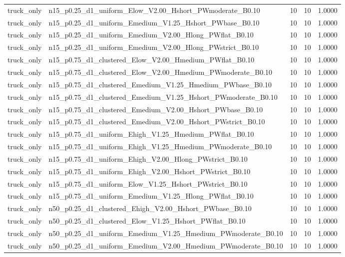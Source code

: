 \begin{tabular}{llrrr}
truck_only & n15_p0.25_d1_uniform_Elow_V2.00_Hshort_PWmoderate_B0.10 & 10 & 10 & 1.0000 \\
truck_only & n15_p0.25_d1_uniform_Emedium_V1.25_Hshort_PWbase_B0.10 & 10 & 10 & 1.0000 \\
truck_only & n15_p0.25_d1_uniform_Emedium_V2.00_Hlong_PWflat_B0.10 & 10 & 10 & 1.0000 \\
truck_only & n15_p0.25_d1_uniform_Emedium_V2.00_Hlong_PWstrict_B0.10 & 10 & 10 & 1.0000 \\
truck_only & n15_p0.75_d1_clustered_Elow_V2.00_Hmedium_PWflat_B0.10 & 10 & 10 & 1.0000 \\
truck_only & n15_p0.75_d1_clustered_Elow_V2.00_Hmedium_PWmoderate_B0.10 & 10 & 10 & 1.0000 \\
truck_only & n15_p0.75_d1_clustered_Emedium_V1.25_Hmedium_PWbase_B0.10 & 10 & 10 & 1.0000 \\
truck_only & n15_p0.75_d1_clustered_Emedium_V1.25_Hshort_PWmoderate_B0.10 & 10 & 10 & 1.0000 \\
truck_only & n15_p0.75_d1_clustered_Emedium_V2.00_Hshort_PWbase_B0.10 & 10 & 10 & 1.0000 \\
truck_only & n15_p0.75_d1_clustered_Emedium_V2.00_Hshort_PWstrict_B0.10 & 10 & 10 & 1.0000 \\
truck_only & n15_p0.75_d1_uniform_Ehigh_V1.25_Hmedium_PWflat_B0.10 & 10 & 10 & 1.0000 \\
truck_only & n15_p0.75_d1_uniform_Ehigh_V1.25_Hmedium_PWmoderate_B0.10 & 10 & 10 & 1.0000 \\
truck_only & n15_p0.75_d1_uniform_Ehigh_V2.00_Hlong_PWstrict_B0.10 & 10 & 10 & 1.0000 \\
truck_only & n15_p0.75_d1_uniform_Ehigh_V2.00_Hshort_PWstrict_B0.10 & 10 & 10 & 1.0000 \\
truck_only & n15_p0.75_d1_uniform_Elow_V1.25_Hshort_PWstrict_B0.10 & 10 & 10 & 1.0000 \\
truck_only & n15_p0.75_d1_uniform_Emedium_V1.25_Hlong_PWflat_B0.10 & 10 & 10 & 1.0000 \\
truck_only & n50_p0.25_d1_clustered_Ehigh_V2.00_Hshort_PWbase_B0.10 & 10 & 10 & 1.0000 \\
truck_only & n50_p0.25_d1_clustered_Elow_V1.25_Hshort_PWflat_B0.10 & 10 & 10 & 1.0000 \\
truck_only & n50_p0.25_d1_uniform_Emedium_V1.25_Hmedium_PWmoderate_B0.10 & 10 & 10 & 1.0000 \\
truck_only & n50_p0.25_d1_uniform_Emedium_V2.00_Hmedium_PWmoderate_B0.10 & 10 & 10 & 1.0000 \\

\end{tabular}
